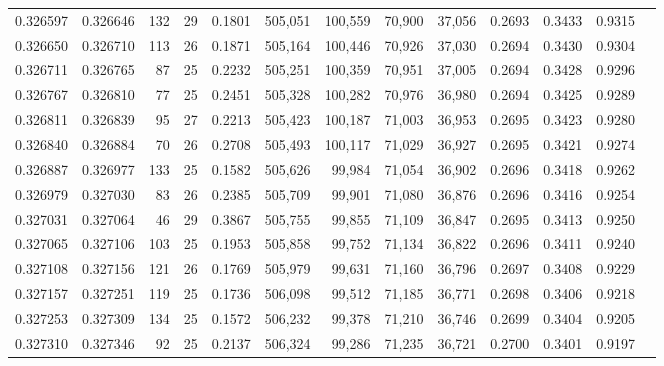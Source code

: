 \begin{tabular}{rrrrrrrrrrrrr}
0.326597 & 0.326646 &   132 &  29 &                                     0.1801 & 505,051 & 100,559 &  70,900 &  37,056 & 0.2693 & 0.3433 & 0.9315 \\
0.326650 & 0.326710 &   113 &  26 &                                     0.1871 & 505,164 & 100,446 &  70,926 &  37,030 & 0.2694 & 0.3430 & 0.9304 \\
0.326711 & 0.326765 &    87 &  25 &                                     0.2232 & 505,251 & 100,359 &  70,951 &  37,005 & 0.2694 & 0.3428 & 0.9296 \\
0.326767 & 0.326810 &    77 &  25 &                                     0.2451 & 505,328 & 100,282 &  70,976 &  36,980 & 0.2694 & 0.3425 & 0.9289 \\
0.326811 & 0.326839 &    95 &  27 &                                     0.2213 & 505,423 & 100,187 &  71,003 &  36,953 & 0.2695 & 0.3423 & 0.9280 \\
0.326840 & 0.326884 &    70 &  26 &                                     0.2708 & 505,493 & 100,117 &  71,029 &  36,927 & 0.2695 & 0.3421 & 0.9274 \\
0.326887 & 0.326977 &   133 &  25 &                                     0.1582 & 505,626 &  99,984 &  71,054 &  36,902 & 0.2696 & 0.3418 & 0.9262 \\
0.326979 & 0.327030 &    83 &  26 &                                     0.2385 & 505,709 &  99,901 &  71,080 &  36,876 & 0.2696 & 0.3416 & 0.9254 \\
0.327031 & 0.327064 &    46 &  29 &                                     0.3867 & 505,755 &  99,855 &  71,109 &  36,847 & 0.2695 & 0.3413 & 0.9250 \\
0.327065 & 0.327106 &   103 &  25 &                                     0.1953 & 505,858 &  99,752 &  71,134 &  36,822 & 0.2696 & 0.3411 & 0.9240 \\
0.327108 & 0.327156 &   121 &  26 &                                     0.1769 & 505,979 &  99,631 &  71,160 &  36,796 & 0.2697 & 0.3408 & 0.9229 \\
0.327157 & 0.327251 &   119 &  25 &                                     0.1736 & 506,098 &  99,512 &  71,185 &  36,771 & 0.2698 & 0.3406 & 0.9218 \\
0.327253 & 0.327309 &   134 &  25 &                                     0.1572 & 506,232 &  99,378 &  71,210 &  36,746 & 0.2699 & 0.3404 & 0.9205 \\
0.327310 & 0.327346 &    92 &  25 &                                     0.2137 & 506,324 &  99,286 &  71,235 &  36,721 & 0.2700 & 0.3401 & 0.9197 \\

\end{tabular}
